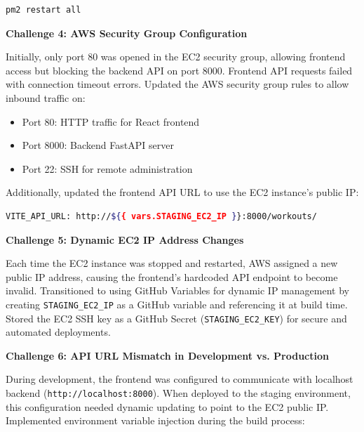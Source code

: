 \documentclass{article}
\begin{document}
\begin{lstlisting}[language=bash, caption=PM2 backend restart]
pm2 restart all
\end{lstlisting}

\vspace{0.3cm}

\textbf{Challenge 4: AWS Security Group Configuration}

Initially, only port 80 was opened in the EC2 security group, allowing frontend access but blocking the backend API on port 8000. Frontend API requests failed with connection timeout errors. Updated the AWS security group rules to allow inbound traffic on:
\begin{itemize}
    \item Port 80: HTTP traffic for React frontend
    \item Port 8000: Backend FastAPI server
    \item Port 22: SSH for remote administration
\end{itemize}

Additionally, updated the frontend API URL to use the EC2 instance's public IP:

\begin{lstlisting}[language=bash, caption=Frontend environment variable]
VITE_API_URL: http://${{ vars.STAGING_EC2_IP }}:8000/workouts/
\end{lstlisting}

\vspace{0.3cm}

\textbf{Challenge 5: Dynamic EC2 IP Address Changes}

Each time the EC2 instance was stopped and restarted, AWS assigned a new public IP address, causing the frontend's hardcoded API endpoint to become invalid. Transitioned to using GitHub Variables for dynamic IP management by creating \texttt{STAGING\_EC2\_IP} as a GitHub variable and referencing it at build time. Stored the EC2 SSH key as a GitHub Secret (\texttt{STAGING\_EC2\_KEY}) for secure and automated deployments.

\vspace{0.3cm}

\textbf{Challenge 6: API URL Mismatch in Development vs. Production}

During development, the frontend was configured to communicate with localhost backend (\texttt{http://localhost:8000}). When deployed to the staging environment, this configuration needed dynamic updating to point to the EC2 public IP. Implemented environment variable injection during the build process:
\end{document}
